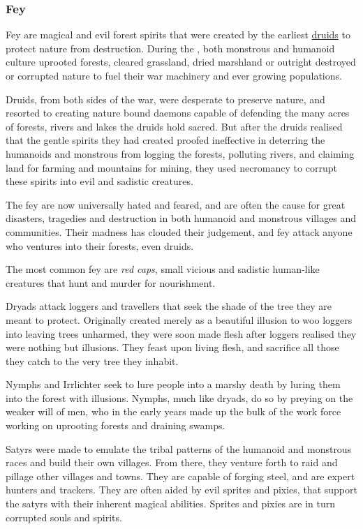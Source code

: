 \subsubsection{Fey}
\label{sec:Fey}

Fey are magical and evil forest spirits that were created by the
earliest \hyperref[sec:Druids]{druids} to protect nature from
destruction. During the , both monstrous and humanoid
culture uprooted forests, cleared grassland, dried marshland or outright
destroyed or corrupted nature to fuel their war machinery and ever growing
populations.

Druids, from both sides of the war, were desperate to preserve nature, and
resorted to creating nature bound daemons capable of defending the many
acres of forests, rivers and lakes the druids hold sacred. But after the
druids realised that the gentle spirits they had created proofed ineffective
in deterring the humanoids and monstrous from logging the forests, polluting
rivers, and claiming land for farming and mountains for mining, they used
necromancy to corrupt these spirits into evil and sadistic creatures.

The fey are now universally hated and feared, and are often the cause for
great disasters, tragedies and destruction in both humanoid and monstrous
villages and communities. Their madness has clouded their judgement, and fey
attack anyone who ventures into their forests, even druids.

The most common fey are \emph{red caps}, small vicious and sadistic
human-like creatures that hunt and murder for nourishment.

Dryads attack loggers and travellers that seek the shade of the tree they are
meant to protect. Originally created merely as a beautiful illusion to woo
loggers into leaving trees unharmed, they were soon made flesh after loggers
realised they were nothing but illusions. They feast upon living flesh, and
sacrifice all those they catch to the very tree they inhabit.

Nymphs and Irrlichter seek to lure people into a marshy death by luring them
into the forest with illusions. Nymphs, much like dryads, do so by preying on
the weaker will of men, who in the early years made up the bulk of the work
force working on uprooting forests and draining swamps.

Satyrs were made to emulate the tribal patterns of the humanoid and monstrous
races and build their own villages. From there, they venture forth to raid and
pillage other villages and towns. They are capable of forging steel, and are
expert hunters and trackers. They are often aided by evil sprites and pixies,
that support the satyrs with their inherent magical abilities. Sprites and
pixies are in turn corrupted souls and spirits.

